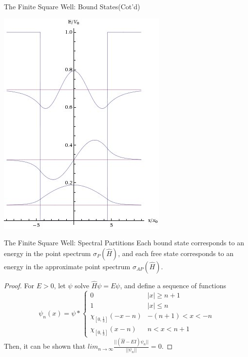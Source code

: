 \documentclass{beamer}
\begin{document}
\begin{frame}{The Finite Square Well: Bound States(Cot'd)}
    \begin{center}
    \includegraphics[scale=0.4]{FSW_soln}
    \end{center}
\end{frame}

\begin{frame}{The Finite Square Well: Spectral Partitions}
    Each bound state corresponds to an energy in the point spectrum
    $\sigma_P(\hat{H})$, and each free state corresponds to an energy in the
    approximate point spectrum $\sigma_{AP}(\hat{H})$.

    \begin{proof}
        For $E>0$, let $\psi$ solve $\hat{H}\psi=E\psi$, and define a sequence
        of functions
        \[
            \psi_n(x) = \psi *
            \begin{cases}
                0 & |x| \geq n+1\\
                1 & |x| \leq n \\
                \chi_{[0,\frac{1}{3}]}(-x-n) & -(n+1)<x<-n\\
                \chi_{[0,\frac{1}{3}]}(x-n) & n<x<n+1
            \end{cases}
            \]
        Then, it can be shown that
        $lim_{n\to\infty}\frac{||(\hat{H}-EI)\psi_n||}{||\psi_n||} = 0$.
    \end{proof}
\end{frame}
\end{document}
